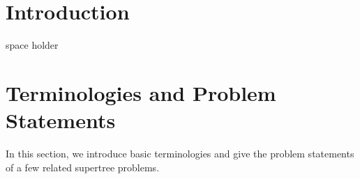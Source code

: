 \documentclass{bmcart}
\theoremstyle{mystyle}
\theoremstyle{proofstyle}
\begin{document}



\section{Introduction}
\newpage
space holder
\newpage



\section{Terminologies and Problem Statements}\label{sec:prelim}
In this section, we introduce basic terminologies and give the problem statements of a few related supertree problems.\smallskip
\end{document}
